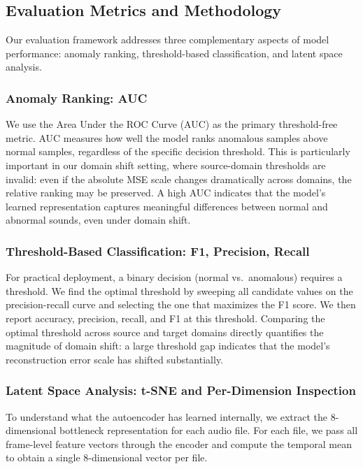 \documentclass[sigconf]{acmart}
\begin{document}
\subsection{Evaluation Metrics and Methodology}

Our evaluation framework addresses three complementary aspects of model performance: anomaly ranking, threshold-based classification, and latent space analysis.

\subsubsection{Anomaly Ranking: AUC}

We use the Area Under the ROC Curve (AUC) as the primary threshold-free metric. AUC measures how well the model ranks anomalous samples above normal samples, regardless of the specific decision threshold. This is particularly important in our domain shift setting, where source-domain thresholds are invalid: even if the absolute MSE scale changes dramatically across domains, the relative ranking may be preserved. A high AUC indicates that the model's learned representation captures meaningful differences between normal and abnormal sounds, even under domain shift.

\subsubsection{Threshold-Based Classification: F1, Precision, Recall}

For practical deployment, a binary decision (normal vs.\ anomalous) requires a threshold. We find the optimal threshold by sweeping all candidate values on the precision-recall curve and selecting the one that maximizes the F1 score. We then report accuracy, precision, recall, and F1 at this threshold. Comparing the optimal threshold across source and target domains directly quantifies the magnitude of domain shift: a large threshold gap indicates that the model's reconstruction error scale has shifted substantially.

\subsubsection{Latent Space Analysis: t-SNE and Per-Dimension Inspection}

To understand what the autoencoder has learned internally, we extract the 8-dimensional bottleneck representation for each audio file. For each file, we pass all frame-level feature vectors through the encoder and compute the temporal mean to obtain a single 8-dimensional vector per file.
\end{document}
